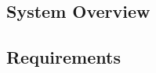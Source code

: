 



\subsection{System Overview}
\label{sub:system_overview}

\subsection{Requirements}
\label{sub:requirements}